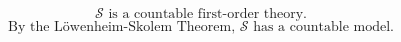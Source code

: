 $$
\mathcal{S} \text{ is a countable first-order theory.}
$$
$$
\text{By the L\"owenheim-Skolem Theorem, } \mathcal{S} \text{ has a countable model.}
$$
